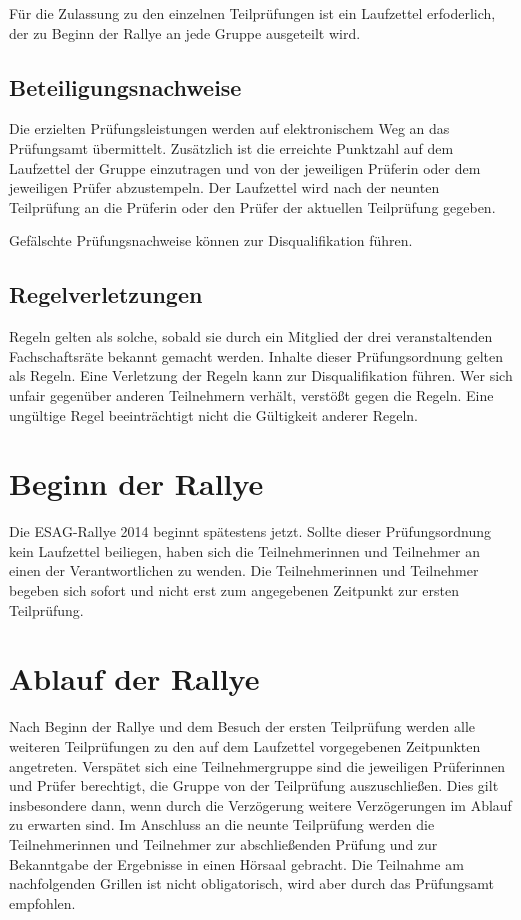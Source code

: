 \documentclass[a4paper,10pt]{article}
\begin{document}
Für die Zulassung zu den einzelnen Teilprüfungen ist ein Laufzettel erfoderlich, 
der zu Beginn der Rallye an jede Gruppe ausgeteilt wird.

\subsection{Beteiligungsnachweise}


Die erzielten Prüfungsleistungen werden auf elektronischem Weg an das
Prüfungsamt übermittelt. Zusätzlich ist die erreichte Punktzahl auf dem 
Laufzettel der Gruppe einzutragen und von der jeweiligen Prüferin oder dem
jeweiligen Prüfer abzustempeln. 
Der Laufzettel wird nach der neunten Teilprüfung an die Prüferin oder den Prüfer 
der aktuellen Teilprüfung gegeben.

Gefälschte Prüfungsnachweise können zur Disqualifikation führen.

\subsection{Regelverletzungen}

Regeln gelten als solche, sobald sie durch ein Mitglied der drei 
veranstaltenden Fachschaftsräte bekannt gemacht werden. Inhalte dieser
Prüfungsordnung gelten als Regeln. Eine Verletzung der Regeln kann zur
Disqualifikation führen. Wer sich unfair gegenüber anderen Teilnehmern
verhält, verstößt gegen die Regeln. Eine ungültige Regel beeinträchtigt
nicht die Gültigkeit anderer Regeln.



\section{Beginn der Rallye}

Die ESAG-Rallye 2014 beginnt spätestens jetzt. Sollte dieser Prüfungsordnung
kein Laufzettel beiliegen, haben sich die Teilnehmerinnen und Teilnehmer an 
einen der Verantwortlichen zu wenden. Die Teilnehmerinnen und Teilnehmer
begeben sich sofort und nicht erst zum angegebenen Zeitpunkt zur ersten
Teilprüfung.

\section{Ablauf der Rallye}
Nach Beginn der Rallye und dem Besuch der ersten Teilprüfung werden alle 
weiteren Teilprüfungen zu den auf dem Laufzettel vorgegebenen Zeitpunkten 
angetreten. Verspätet sich eine Teilnehmergruppe sind die jeweiligen Prüferinnen
und Prüfer berechtigt, die Gruppe von der Teilprüfung auszuschließen. Dies 
gilt insbesondere dann, wenn durch die Verzögerung weitere Verzögerungen im 
Ablauf zu erwarten sind. Im Anschluss an die neunte Teilprüfung werden die 
Teilnehmerinnen und Teilnehmer zur abschließenden Prüfung und zur Bekanntgabe 
der Ergebnisse in einen Hörsaal gebracht. Die Teilnahme am nachfolgenden 
Grillen ist nicht obligatorisch, wird aber durch das Prüfungsamt empfohlen.
\end{document}

